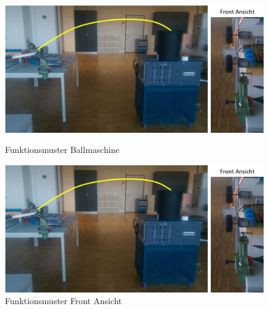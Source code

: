 \begin{figure}[h!]
    \begin{minipage}[hbt]{0.7\textwidth}
    	\includegraphics[width=1\textwidth,clip,trim=0mm 0cm 7cm 0cm]
    	{Funktionstests/Bilder/Ballmaschine.jpg}
    	\centering
    	\caption{Funktionsmuster Ballmaschine} 
        \label{abb:Ballmaschine_Drehzahl1}
    \end{minipage}
\hfill
    \begin{minipage}[hbt]{0.3\textwidth}
    	\includegraphics[width=.9\textwidth,clip,trim=27cm 2cm 0mm 2.5cm]
    	{Funktionstests/Bilder/Ballmaschine.jpg}
    	\centering
    	\caption{Funktionsmuster Front Ansicht} 
        \label{abb:Ballmaschine_Drehzahl1}
    \end{minipage}
\end{figure}